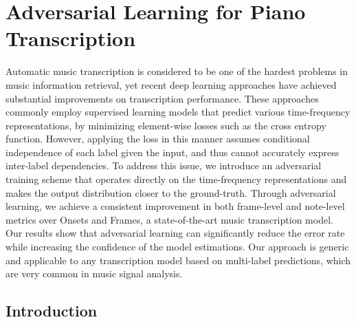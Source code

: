 
\graphicspath{{6-adversarial/figures/}}

\chapter{Adversarial Learning for Piano Transcription}
\label{ch:adversarial}


\renewcommand{\L}{\mathcal{L}}
\newcommand{\E}{\mathbb{E}}
\newcommand{\R}{\mathbb{R}}
\newcommand{\x}{\mathbf{x}}
\newcommand{\y}{\mathbf{y}}
\newcommand{\z}{\mathbf{z}}
\newcommand{\X}{\mathbf{X}}
\newcommand{\Y}{\mathbf{Y}}


Automatic music transcription is considered to be one of the hardest problems in music information retrieval, yet recent deep learning approaches have achieved substantial improvements on transcription performance.
These approaches commonly employ supervised learning models that predict various time-frequency representations, by minimizing element-wise losses such as the cross entropy function.
However, applying the loss in this manner assumes conditional independence of each label given the input, and thus cannot accurately express inter-label dependencies.
To address this issue, we introduce an adversarial training scheme that operates directly on the time-frequency representations and makes the output distribution closer to the ground-truth.
Through adversarial learning, we achieve a consistent improvement in both frame-level and note-level metrics over Onsets and Frames, a state-of-the-art music transcription model.
Our results show that adversarial learning can significantly reduce the error rate while increasing the confidence of the model estimations.
Our approach is generic and applicable to any transcription model based on multi-label predictions, which are very common in music signal analysis.



\section{Introduction}\label{sec:introduction}

